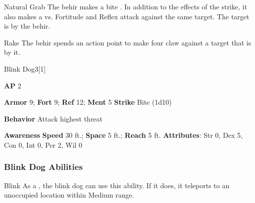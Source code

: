 \vspace{0.5em}
\begin{ability}{Natural Grab}
The behir makes a bite .
In addition to the effects of the strike, it also makes a  vs. Fortitude and Reflex attack against the same target.
\hit The target is  by the behir.
\end{ability}

\vspace{0.5em}
\begin{ability}{Rake}
The behir spends an action point to make four claw  against a target that is  by it.
\end{ability}

\begin{monsection}{Blink Dog}{3}[1]
\vspace{-1em}\vspace{-1em}
\begin{spellcontent}
\begin{spelltargetinginfo}
{\textbf{AP} 2}

\pari \textbf{Armor} 9;
\textbf{Fort} 9;
\textbf{Ref} 12;
\textbf{Ment} 5
\pari \textbf{Strike} Bite  (1d10)



\pari \textbf{Behavior} Attack highest threat
\end{spelltargetinginfo}
\end{spellcontent}

\begin{monsterfooter}
\pari \textbf{Awareness} 
\pari \textbf{Speed} 30 ft.;
\textbf{Space} 5 ft.;
\textbf{Reach} 5 ft.
\pari \textbf{Attributes}:
Str 0,
Dex 5,
Con 0,
Int 0,
Per 2,
Wil 0
\end{monsterfooter}
\end{monsection}


\subsubsection{Blink Dog Abilities}

\begin{ability}{Blink}
As a , the blink dog can use this ability.
If it does, it teleports to an unoccupied location within Medium range.
\end{ability}

